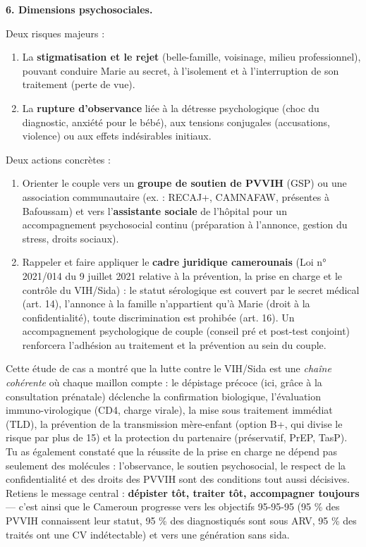 \documentclass[11pt]{article}
\newcounter{popsec}
\newcounter{popsub}
\newcommand{\courssub}[1]{%
  \stepcounter{popsub}%
  \par\vspace{9pt}\noindent{\popxbold\fontsize{11.5}{13}\selectfont\color{popink}{\color{poporange}\thepopsec.\thepopsub}\hspace{6pt}#1}\par\nopagebreak\vspace{4pt}
}
\begin{document}
\begin{exoresolu}
\textbf{6. Dimensions psychosociales.}

Deux risques majeurs :
\begin{enumerate}
\item La \textbf{stigmatisation et le rejet} (belle-famille, voisinage, milieu professionnel), pouvant conduire Marie au secret, à l'isolement et à l'interruption de son traitement (perte de vue).
\item La \textbf{rupture d'observance} liée à la détresse psychologique (choc du diagnostic, anxiété pour le bébé), aux tensions conjugales (accusations, violence) ou aux effets indésirables initiaux.
\end{enumerate}
Deux actions concrètes :
\begin{enumerate}
\item Orienter le couple vers un \textbf{groupe de soutien de PVVIH} (GSP) ou une association communautaire (ex. : RECAJ+, CAMNAFAW, présentes à Bafoussam) et vers l'\textbf{assistante sociale} de l'hôpital pour un accompagnement psychosocial continu (préparation à l'annonce, gestion du stress, droits sociaux).
\item Rappeler et faire appliquer le \textbf{cadre juridique camerounais} (Loi n° 2021/014 du 9 juillet 2021 relative à la prévention, la prise en charge et le contrôle du VIH/Sida) : le statut sérologique est couvert par le secret médical (art. 14), l'annonce à la famille n'appartient qu'à Marie (droit à la confidentialité), toute discrimination est prohibée (art. 16). Un accompagnement psychologique de couple (conseil pré et post-test conjoint) renforcera l'adhésion au traitement et la prévention au sein du couple.
\end{enumerate}
\end{exoresolu}

\courssub{Bilan de l'activité}

Cette étude de cas a montré que la lutte contre le VIH/Sida est une \emph{chaîne cohérente} où chaque maillon compte : le dépistage précoce (ici, grâce à la consultation prénatale) déclenche la confirmation biologique, l'évaluation immuno-virologique (CD4, charge virale), la mise sous traitement immédiat (TLD), la prévention de la transmission mère-enfant (option B+, qui divise le risque par plus de 15) et la protection du partenaire (préservatif, PrEP, TasP). Tu as également constaté que la réussite de la prise en charge ne dépend pas seulement des molécules : l'observance, le soutien psychosocial, le respect de la confidentialité et des droits des PVVIH sont des conditions tout aussi décisives. Retiens le message central : \textbf{dépister tôt, traiter tôt, accompagner toujours} — c'est ainsi que le Cameroun progresse vers les objectifs 95-95-95 (95 \% des PVVIH connaissent leur statut, 95 \% des diagnostiqués sont sous ARV, 95 \% des traités ont une CV indétectable) et vers une génération sans sida.
\end{document}

